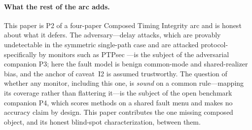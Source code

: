 \paragraph{What the rest of the arc adds.}
This paper is P2 of a four-paper Composed Timing Integrity arc and is honest about
what it defers. The adversary---delay attacks, which are provably undetectable in
the symmetric single-path case \citep{mizrahi7384,narula2018} and are attacked
protocol-specifically by monitors such as PTPsec \citep{finkenzeller2024ptpsec}---is
the subject of the adversarial companion P3; here the fault model is benign
common-mode and shared-realizer bias, and the anchor of caveat~I2 is assumed
trustworthy. The question of whether any monitor, including this one, is
\emph{sound} on a common rule---mapping its coverage rather than flattering
it---is the subject of the open benchmark companion P4, which scores methods on a
shared fault menu and makes no accuracy claim by design. This paper contributes the
one missing composed object, and its honest blind-spot characterization, between
them.
